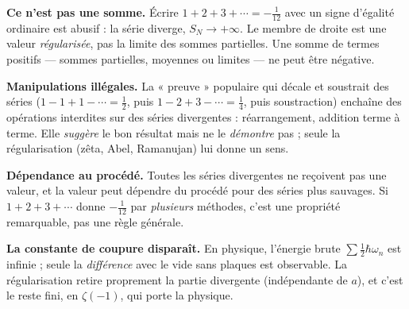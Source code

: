 \begin{mdframed}[style=cexbar]
  \textbf{Ce n'est pas une somme.}\enspace%
  Écrire $1+2+3+\cdots=-\tfrac1{12}$ avec un signe d'égalité ordinaire est
  abusif : la série diverge, $S_N\to+\infty$. Le membre de droite est une valeur
  \emph{régularisée}, pas la limite des sommes partielles. Une somme de termes
  positifs — sommes partielles, moyennes ou limites — ne peut être négative.

  \smallskip\noindent
  \textbf{Manipulations illégales.}\enspace%
  La « preuve » populaire qui décale et soustrait des séries
  ($1-1+1-\cdots=\tfrac12$, puis $1-2+3-\cdots=\tfrac14$, puis soustraction)
  enchaîne des opérations interdites sur des séries divergentes : réarrangement,
  addition terme à terme. Elle \emph{suggère} le bon résultat mais ne le
  \emph{démontre} pas ; seule la régularisation (zêta, Abel, Ramanujan) lui donne
  un sens.

  \smallskip\noindent
  \textbf{Dépendance au procédé.}\enspace%
  Toutes les séries divergentes ne reçoivent pas une valeur, et la valeur peut
  dépendre du procédé pour des séries plus sauvages. Si $1+2+3+\cdots$ donne
  $-\tfrac1{12}$ par \emph{plusieurs} méthodes, c'est une propriété remarquable,
  pas une règle générale.

  \smallskip\noindent
  \textbf{La constante de coupure disparaît.}\enspace%
  En physique, l'énergie brute $\sum\tfrac12\hbar\omega_n$ est infinie ; seule la
  \emph{différence} avec le vide sans plaques est observable. La régularisation
  retire proprement la partie divergente (indépendante de $a$), et c'est le reste
  fini, en $\zeta(-1)$, qui porte la physique.
\end{mdframed}

\vspace{6pt}
\exolabel

